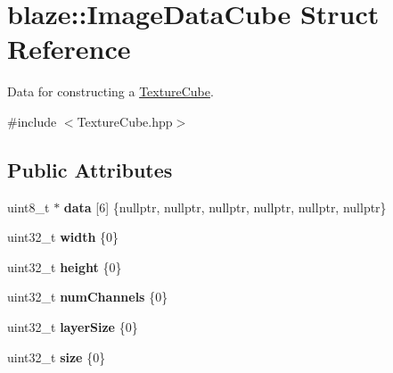\hypertarget{structblaze_1_1ImageDataCube}{}\section{blaze\+:\+:Image\+Data\+Cube Struct Reference}
\label{structblaze_1_1ImageDataCube}


Data for constructing a \hyperlink{classblaze_1_1TextureCube}{Texture\+Cube}.  




{\ttfamily \#include $<$Texture\+Cube.\+hpp$>$}

\subsection*{Public Attributes}
\begin{DoxyCompactItemize}
\item 
\mbox{\label{structblaze_1_1ImageDataCube_ab02af7f04ba492d8d7363499dd054240}} 
uint8\+\_\+t $\ast$ {\bfseries data} \mbox{[}6\mbox{]} \{nullptr, nullptr, nullptr, nullptr, nullptr, nullptr\}
\item 
\mbox{\label{structblaze_1_1ImageDataCube_ab58f68db8402ad7adadd8bdf640e4ff3}} 
uint32\+\_\+t {\bfseries width} \{0\}
\item 
\mbox{\label{structblaze_1_1ImageDataCube_a137cb13ea489a864a0632ce81b4d631a}} 
uint32\+\_\+t {\bfseries height} \{0\}
\item 
\mbox{\label{structblaze_1_1ImageDataCube_a6c1b1a664b279bf6951f2542fef28447}} 
uint32\+\_\+t {\bfseries num\+Channels} \{0\}
\item 
\mbox{\label{structblaze_1_1ImageDataCube_a153bd793a912aaf1991975e66acc5955}} 
uint32\+\_\+t {\bfseries layer\+Size} \{0\}
\item 
\mbox{\label{structblaze_1_1ImageDataCube_ae155eab89edab9a55f1cbd7d1db40861}} 
uint32\+\_\+t {\bfseries size} \{0\}
\item 
\mbox{\label{structblaze_1_1ImageDataCube_aad72a9b0449cb8d2829688a6510dbf03}} 

\end{DoxyCompactItemize}
